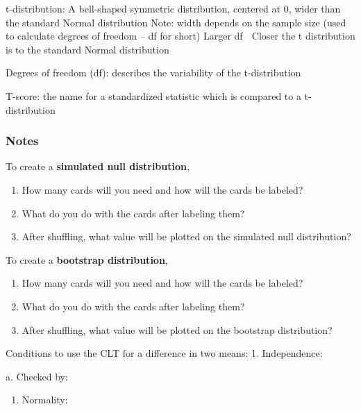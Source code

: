 \documentclass[
]{report}
\providecommand{\tightlist}{%
  \setlength{\itemsep}{0pt}\setlength{\parskip}{0pt}}
\newcommand{\rgs}{\vspace{12pt}} %
\newcommand{\rgi}{\hspace{24pt}}  %
\begin{document}
t-distribution: A bell-shaped symmetric distribution, centered at 0, wider than the standard Normal distribution
Note: width depends on the sample size (used to calculate degrees of freedom -- df for short)
Larger df  Closer the t distribution is to the standard Normal distribution

Degrees of freedom (df): describes the variability of the t-distribution

T-score: the name for a standardized statistic which is compared to a t-distribution

\hypertarget{notes-26}{%
\subsubsection*{Notes}\label{notes-26}}

To create a \textbf{simulated null distribution},

\begin{enumerate}
\def\labelenumi{\arabic{enumi}.}
\item
  How many cards will you need and how will the cards be labeled?
  \rgs
\item
  What do you do with the cards after labeling them?
  \rgs
\item
  After shuffling, what value will be plotted on the simulated null distribution?
  \rgs
\end{enumerate}

To create a \textbf{bootstrap distribution},

\begin{enumerate}
\def\labelenumi{\arabic{enumi}.}
\item
  How many cards will you need and how will the cards be labeled?
  \rgs
\item
  What do you do with the cards after labeling them?
  \rgs
\item
  After shuffling, what value will be plotted on the bootstrap distribution?
  \rgs
\end{enumerate}

Conditions to use the CLT for a difference in two means:
1. Independence:
\rgs

\rgi a. Checked by:
\rgs

\begin{enumerate}
\def\labelenumi{\arabic{enumi}.}
\setcounter{enumi}{1}
\tightlist
\item
  Normality:
  \rgs
\end{enumerate}
\end{document}
